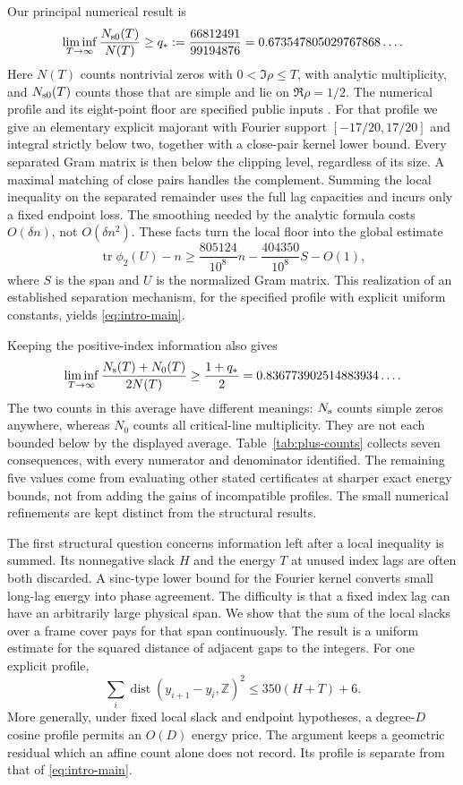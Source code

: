 \documentclass[11pt,reqno]{amsart}
\numberwithin{equation}{section}
\newcommand{\Z}{\mathbb Z}
\newcommand{\tr}{\operatorname{tr}}
\newcommand{\dist}{\operatorname{dist}}
\newcommand{\Ns}{N_{\rm s}}
\newcommand{\Nsc}{N_{\rm s0}}
\newcommand{\Nc}{N_0}
\begin{document}
Our principal numerical result is
\begin{equation}
 \liminf_{T\to\infty}\frac{\Nsc(T)}{N(T)}
 \ge q_*:=\frac{66812491}{99194876}
 =0.673547805029767868\ldots .
 \label{eq:intro-main}
\end{equation}
Here \(N(T)\) counts nontrivial zeros with \(0<\Im\rho\le T\),
with analytic multiplicity, and \(\Nsc(T)\) counts those that are
simple and lie on \(\Re\rho=1/2\). The numerical profile and its
eight-point floor are specified public inputs \cite{AMTOPA,Lavery2026}.
For that profile we give an elementary explicit majorant with Fourier
support \([-17/20,17/20]\) and integral strictly below two, together
with a close-pair kernel lower bound. Every separated Gram matrix is
then below the clipping level, regardless of its size. A maximal
matching of close pairs handles the complement. Summing the local
inequality on the separated remainder uses the full lag capacities
and incurs only a fixed endpoint loss. The smoothing needed by the
analytic formula costs \(O(\delta n)\), not \(O(\delta n^2)\).
These facts turn the local floor into the global estimate
\[
 \tr\phi_2(U)-n\ge
 \frac{805124}{10^8}n-\frac{404350}{10^8}S-O(1),
\]
where \(S\) is the span and \(U\) is the normalized Gram matrix.
This realization of an established separation mechanism, for the
specified profile with explicit uniform constants, yields
\eqref{eq:intro-main}.

Keeping the positive-index information also gives
\[
 \liminf_{T\to\infty}\frac{\Ns(T)+\Nc(T)}{2N(T)}
 \ge\frac{1+q_*}{2}=0.836773902514883934\ldots .
\]
The two counts in this average have different meanings:
\(\Ns\) counts simple zeros anywhere, whereas \(\Nc\) counts all
critical-line multiplicity. They are not each bounded below by the
displayed average. Table~\ref{tab:plus-counts} collects seven
consequences, with every numerator and denominator identified.
The remaining five values come from evaluating other stated
certificates at sharper exact energy bounds, not from adding the
gains of incompatible profiles. The small numerical refinements
are kept distinct from the structural results.

The first structural question concerns information left after a local
inequality is summed. Its nonnegative slack \(H\) and the energy \(T\)
at unused index lags are often both discarded. A sinc-type lower bound
for the Fourier kernel converts small long-lag energy into phase
agreement. The difficulty is that a fixed index lag can have an
arbitrarily large physical span. We show that the sum of the local
slacks over a frame cover pays for that span continuously. The result
is a uniform estimate for the squared distance of adjacent gaps to
the integers. For one explicit profile,
\begin{equation}
 \sum_i\dist(y_{i+1}-y_i,\Z)^2\le350(H+T)+6.
 \label{eq:intro-rigidity}
\end{equation}
More generally, under fixed local slack and endpoint hypotheses, a
degree-\(D\) cosine profile permits an \(O(D)\) energy price. The
argument keeps a geometric residual which an affine count alone
does not record. Its profile is separate from that of
\eqref{eq:intro-main}.
\end{document}
